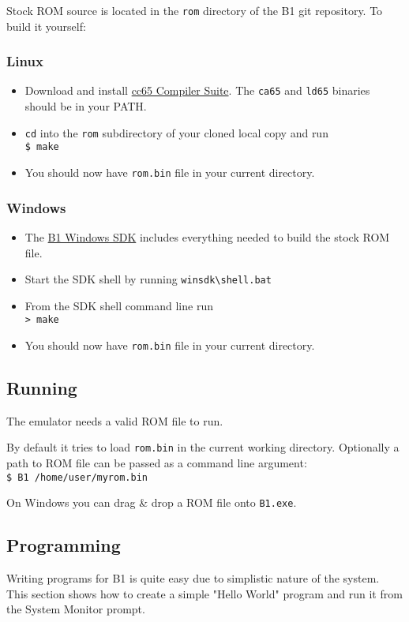\documentclass[a4paper,10pt,oneside]{article}
\begin{document}
Stock ROM source is located in the \texttt{rom} directory of the B1 git repository. To build it yourself:
\subsubsection*{Linux}
\begin{itemize}
  \item Download and install \href{http://cc65.github.io/cc65/}{cc65 Compiler Suite}. The \texttt{ca65} and \texttt{ld65} binaries should be in your PATH.
  \item \texttt{cd} into the \texttt{rom} subdirectory of your cloned local copy and run \\ \texttt{\$ make}
  \item You should now have \texttt{rom.bin} file in your current directory.
\end{itemize}

\subsubsection*{Windows}
\begin{itemize}
  \item The \href{https://www.siejak.pl/files/b1/b1-winsdk.zip}{B1 Windows SDK} includes everything needed to build the stock ROM file.
  \item Start the SDK shell by running \texttt{winsdk\textbackslash{}shell.bat}
  \item From the SDK shell command line run \\ \texttt{> make}
  \item You should now have \texttt{rom.bin} file in your current directory.
\end{itemize}

\subsection{Running}
The emulator needs a valid ROM file to run. 

By default it tries to load \texttt{rom.bin} in the current working directory. Optionally a path to ROM file can be passed as a command line argument: \\ \texttt{\$ B1 /home/user/myrom.bin}

On Windows you can drag \& drop a ROM file onto \texttt{B1.exe}.

\subsection{Programming}
Writing programs for B1 is quite easy due to simplistic nature of the system. This section shows how to create a simple "Hello World" program and run it from the System Monitor prompt.
\end{document}
